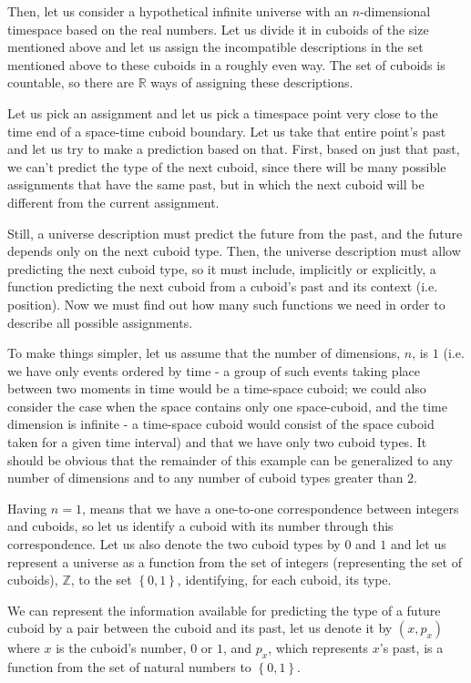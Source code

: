 \documentclass[a4paper
,draft
]{article}
\def\reale{\mathbb{R}}
\def\intregi{\mathbb{Z}}
\newcommand{\multime}[1]{\left\{ #1 \right\}}
\begin{document}
Then, let us consider a hypothetical infinite universe with an $n$-dimensional
timespace based on the real numbers.
Let us divide it in cuboids of the size mentioned above
and let us assign the incompatible
descriptions in the set mentioned above to these cuboids in a roughly even
way.
The set of cuboids is countable, so there are $\reale$ ways of
assigning these descriptions.

Let us pick an assignment and let us pick a timespace point very close to the
time end of a space-time cuboid boundary.
Let us take that entire point's past and let us try to make a prediction based
on that.
First, based on just that past, we can't predict the type of the next cuboid,
since there will be many possible assignments that have the same past, but in
which the next cuboid will be different from the current assignment.

Still, a universe description must predict the future from the past, and
the future depends only on the next cuboid type. Then, the universe
description must allow predicting the next cuboid type, so it must include,
implicitly or explicitly,
a function predicting the next cuboid from a cuboid's past
and its context (i.e. position). Now we must find out how many such functions
we need in order to describe all possible assignments.

To make things simpler, let us assume that the number of dimensions, $n$,
is $1$ (i.e. we have only events ordered by time - a group of such events taking
place between two moments in time would be a time-space cuboid;
we could also consider the
case when the space contains only one space-cuboid, and the time dimension is
infinite - a time-space cuboid would consist of the space cuboid taken for a
given time interval) and that we have only two cuboid types.
It should be obvious that
the remainder of this example can be generalized to any number of dimensions
and to any number of cuboid types greater than $2$.

Having $n=1$, means that we have a one-to-one correspondence between
integers and cuboids, so let us identify a cuboid with its number through this
correspondence.
Let us also denote the two cuboid types by $0$ and $1$ and
let us represent a universe as a function from the set of integers
(representing the set of cuboids), $\intregi$,
to the set $\multime{0, 1}$, identifying, for each cuboid, its type.

We can represent the information available for predicting the type of a future
cuboid by a pair between the cuboid and its past, let us denote it
by $(x, p_x)$ where $x$ is the cuboid's number, $0$ or $1$,
and $p_x$, which represents $x$'s past, is a function from the set of natural
numbers to $\multime{0,1}$.
\end{document}
